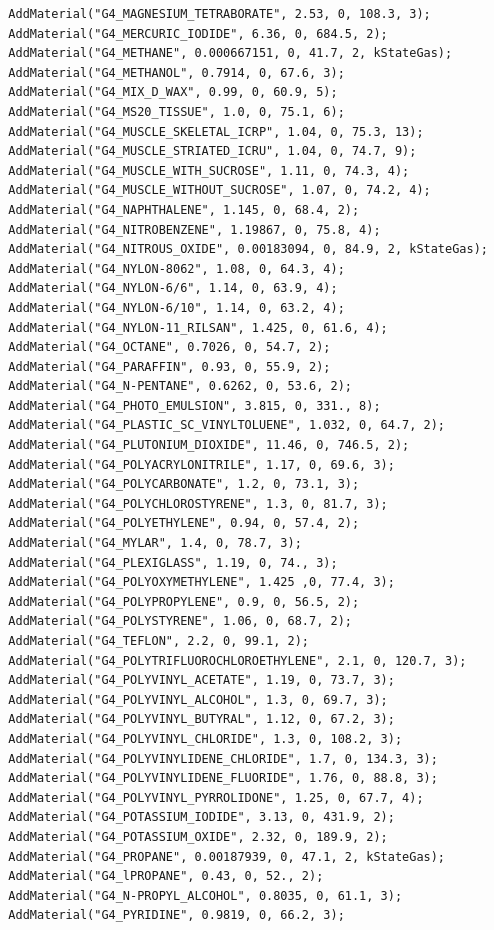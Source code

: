\documentclass[a4paper,12pt]{article}
\begin{document}
\begin{verbatim}
  AddMaterial("G4_MAGNESIUM_TETRABORATE", 2.53, 0, 108.3, 3);
  AddMaterial("G4_MERCURIC_IODIDE", 6.36, 0, 684.5, 2);
  AddMaterial("G4_METHANE", 0.000667151, 0, 41.7, 2, kStateGas);
  AddMaterial("G4_METHANOL", 0.7914, 0, 67.6, 3);
  AddMaterial("G4_MIX_D_WAX", 0.99, 0, 60.9, 5);
  AddMaterial("G4_MS20_TISSUE", 1.0, 0, 75.1, 6);
  AddMaterial("G4_MUSCLE_SKELETAL_ICRP", 1.04, 0, 75.3, 13);
  AddMaterial("G4_MUSCLE_STRIATED_ICRU", 1.04, 0, 74.7, 9);
  AddMaterial("G4_MUSCLE_WITH_SUCROSE", 1.11, 0, 74.3, 4);
  AddMaterial("G4_MUSCLE_WITHOUT_SUCROSE", 1.07, 0, 74.2, 4);
  AddMaterial("G4_NAPHTHALENE", 1.145, 0, 68.4, 2);
  AddMaterial("G4_NITROBENZENE", 1.19867, 0, 75.8, 4);
  AddMaterial("G4_NITROUS_OXIDE", 0.00183094, 0, 84.9, 2, kStateGas);
  AddMaterial("G4_NYLON-8062", 1.08, 0, 64.3, 4);
  AddMaterial("G4_NYLON-6/6", 1.14, 0, 63.9, 4);
  AddMaterial("G4_NYLON-6/10", 1.14, 0, 63.2, 4);
  AddMaterial("G4_NYLON-11_RILSAN", 1.425, 0, 61.6, 4);
  AddMaterial("G4_OCTANE", 0.7026, 0, 54.7, 2);
  AddMaterial("G4_PARAFFIN", 0.93, 0, 55.9, 2);
  AddMaterial("G4_N-PENTANE", 0.6262, 0, 53.6, 2);
  AddMaterial("G4_PHOTO_EMULSION", 3.815, 0, 331., 8);
  AddMaterial("G4_PLASTIC_SC_VINYLTOLUENE", 1.032, 0, 64.7, 2);
  AddMaterial("G4_PLUTONIUM_DIOXIDE", 11.46, 0, 746.5, 2);
  AddMaterial("G4_POLYACRYLONITRILE", 1.17, 0, 69.6, 3);
  AddMaterial("G4_POLYCARBONATE", 1.2, 0, 73.1, 3);
  AddMaterial("G4_POLYCHLOROSTYRENE", 1.3, 0, 81.7, 3);
  AddMaterial("G4_POLYETHYLENE", 0.94, 0, 57.4, 2);
  AddMaterial("G4_MYLAR", 1.4, 0, 78.7, 3);
  AddMaterial("G4_PLEXIGLASS", 1.19, 0, 74., 3);
  AddMaterial("G4_POLYOXYMETHYLENE", 1.425 ,0, 77.4, 3);
  AddMaterial("G4_POLYPROPYLENE", 0.9, 0, 56.5, 2);
  AddMaterial("G4_POLYSTYRENE", 1.06, 0, 68.7, 2);
  AddMaterial("G4_TEFLON", 2.2, 0, 99.1, 2);
  AddMaterial("G4_POLYTRIFLUOROCHLOROETHYLENE", 2.1, 0, 120.7, 3);
  AddMaterial("G4_POLYVINYL_ACETATE", 1.19, 0, 73.7, 3);
  AddMaterial("G4_POLYVINYL_ALCOHOL", 1.3, 0, 69.7, 3);
  AddMaterial("G4_POLYVINYL_BUTYRAL", 1.12, 0, 67.2, 3);
  AddMaterial("G4_POLYVINYL_CHLORIDE", 1.3, 0, 108.2, 3);
  AddMaterial("G4_POLYVINYLIDENE_CHLORIDE", 1.7, 0, 134.3, 3);
  AddMaterial("G4_POLYVINYLIDENE_FLUORIDE", 1.76, 0, 88.8, 3);
  AddMaterial("G4_POLYVINYL_PYRROLIDONE", 1.25, 0, 67.7, 4);
  AddMaterial("G4_POTASSIUM_IODIDE", 3.13, 0, 431.9, 2);
  AddMaterial("G4_POTASSIUM_OXIDE", 2.32, 0, 189.9, 2);
  AddMaterial("G4_PROPANE", 0.00187939, 0, 47.1, 2, kStateGas);
  AddMaterial("G4_lPROPANE", 0.43, 0, 52., 2);
  AddMaterial("G4_N-PROPYL_ALCOHOL", 0.8035, 0, 61.1, 3);
  AddMaterial("G4_PYRIDINE", 0.9819, 0, 66.2, 3);

\end{verbatim}
\end{document}
